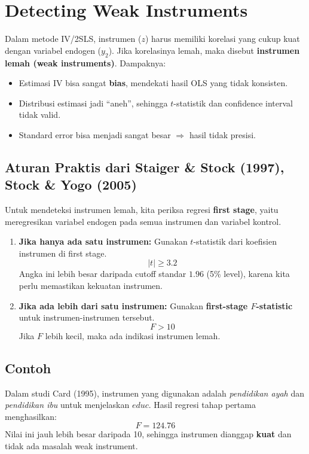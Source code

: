 \documentclass[]{article}
\begin{document}
\section{Detecting Weak Instruments}
Dalam metode IV/2SLS, instrumen ($z$) harus memiliki korelasi yang cukup kuat dengan variabel endogen ($y_2$).
Jika korelasinya lemah, maka disebut \textbf{instrumen lemah (weak instruments)}. 
Dampaknya:
\begin{itemize}
    \item Estimasi IV bisa sangat \textbf{bias}, mendekati hasil OLS yang tidak konsisten.
    \item Distribusi estimasi jadi ``aneh'', sehingga $t$-statistik dan confidence interval tidak valid.
    \item Standard error bisa menjadi sangat besar $\Rightarrow$ hasil tidak presisi.
\end{itemize}

\subsection*{Aturan Praktis dari Staiger \& Stock (1997), Stock \& Yogo (2005)}
Untuk mendeteksi instrumen lemah, kita periksa regresi \textbf{first stage}, yaitu meregresikan variabel endogen pada semua instrumen dan variabel kontrol.

\begin{enumerate}
    \item \textbf{Jika hanya ada satu instrumen:}  
    Gunakan $t$-statistik dari koefisien instrumen di first stage.  
    \[
    |t| \geq 3.2
    \]  
    Angka ini lebih besar daripada cutoff standar $1.96$ (5\% level), karena kita perlu memastikan kekuatan instrumen.
    
    \item \textbf{Jika ada lebih dari satu instrumen:}  
    Gunakan \textbf{first-stage $F$-statistic} untuk instrumen-instrumen tersebut.  
    \[
    F > 10
    \]  
    Jika $F$ lebih kecil, maka ada indikasi instrumen lemah.
\end{enumerate}

\subsection*{Contoh}
Dalam studi Card (1995), instrumen yang digunakan adalah \emph{pendidikan ayah} dan \emph{pendidikan ibu} untuk menjelaskan $educ$.
Hasil regresi tahap pertama menghasilkan:
\[
F = 124.76
\]
Nilai ini jauh lebih besar daripada 10, sehingga instrumen dianggap \textbf{kuat} dan tidak ada masalah weak instrument.
\end{document}
